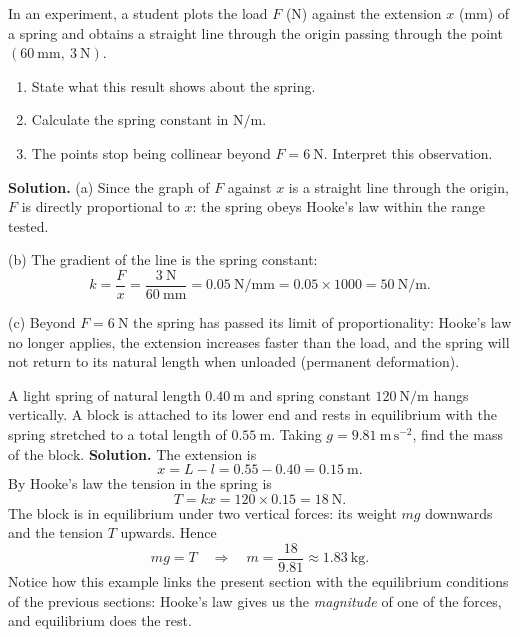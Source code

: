 \documentclass[11pt]{article}
\newcommand{\cle}[1]{{\popxbold\color{popdark}#1}}
\begin{document}
\begin{exoresolu}
In an experiment, a student plots the load $F$ (N) against the extension $x$ (mm) of a spring and obtains a straight line through the origin passing through the point $(60\ \mathrm{mm},\ 3\ \mathrm{N})$.
\begin{enumerate}
\item[(a)] State what this result shows about the spring.
\item[(b)] Calculate the spring constant in $\mathrm{N/m}$.
\item[(c)] The points stop being collinear beyond $F = 6\ \mathrm{N}$. Interpret this observation.
\end{enumerate}
\tcblower
\textbf{Solution.}
(a) Since the graph of $F$ against $x$ is a straight line through the origin, $F$ is directly proportional to $x$: the spring obeys \cle{Hooke's law} within the range tested.

(b) The gradient of the line is the spring constant:
\[ k = \frac{F}{x} = \frac{3\ \mathrm{N}}{60\ \mathrm{mm}} = 0.05\ \mathrm{N/mm} = 0.05 \times 1000 = 50\ \mathrm{N/m}. \]

(c) Beyond $F = 6\ \mathrm{N}$ the spring has passed its \cle{limit of proportionality}: Hooke's law no longer applies, the extension increases faster than the load, and the spring will not return to its natural length when unloaded (permanent deformation).
\end{exoresolu}

\begin{exoresolu}
A light spring of natural length $0.40\ \mathrm{m}$ and spring constant $120\ \mathrm{N/m}$ hangs vertically. A block is attached to its lower end and rests in equilibrium with the spring stretched to a total length of $0.55\ \mathrm{m}$. Taking $g = 9.81\ \mathrm{m\,s^{-2}}$, find the mass of the block.
\tcblower
\textbf{Solution.} The extension is
\[ x = L - l = 0.55 - 0.40 = 0.15\ \mathrm{m}. \]
By Hooke's law the tension in the spring is
\[ T = kx = 120 \times 0.15 = 18\ \mathrm{N}. \]
The block is in equilibrium under two vertical forces: its weight $mg$ downwards and the tension $T$ upwards. Hence
\[ mg = T \quad\Longrightarrow\quad m = \frac{18}{9.81} \approx 1.83\ \mathrm{kg}. \]
Notice how this example links the present section with the equilibrium conditions of the previous sections: Hooke's law gives us the \emph{magnitude} of one of the forces, and equilibrium does the rest.
\end{exoresolu}
\end{document}

